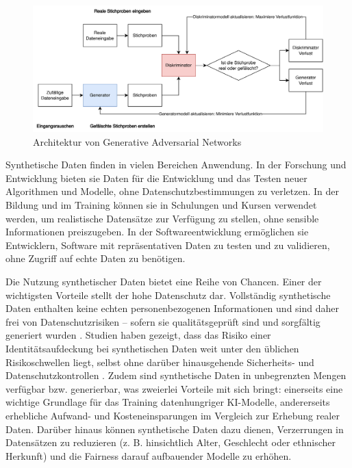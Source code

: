 \begin{spacing}{1.5}
\newpage

\begin{figure}[ht]
\begin{center}
\includegraphics[width=\textwidth]{img/gan.png}
\caption[Architektur von Generative Adversarial Networks]{Architektur von Generative Adversarial Networks\footnotemark}
\label{fig:gan-architecture}
\end{center}
\end{figure}

Synthetische Daten finden in vielen Bereichen Anwendung. In der Forschung und Entwicklung bieten sie Daten für die Entwicklung und das Testen neuer Algorithmen und Modelle, ohne Datenschutzbestimmungen zu verletzen. In der Bildung und im Training können sie in Schulungen und Kursen verwendet werden, um realistische Datensätze zur Verfügung zu stellen, ohne sensible Informationen preiszugeben. In der Softwareentwicklung ermöglichen sie Entwicklern, Software mit repräsentativen Daten zu testen und zu validieren, ohne Zugriff auf echte Daten zu benötigen.

Die Nutzung synthetischer Daten bietet eine Reihe von Chancen. Einer der wichtigsten Vorteile stellt der hohe Datenschutz dar. Vollständig synthetische Daten enthalten keine echten personenbezogenen Informationen und sind daher frei von Datenschutzrisiken -- sofern sie qualitätsgeprüft sind und sorgfältig generiert wurden \cite[58]{hradec_multipurpose_2022}. Studien haben gezeigt, dass das Risiko einer Identitätsaufdeckung bei synthetischen Daten weit unter den üblichen Risikoschwellen liegt, selbst ohne darüber hinausgehende Sicherheits- und Datenschutzkontrollen \cite[9]{el_emam_evaluating_2020}. Zudem sind synthetische Daten in unbegrenzten Mengen verfügbar bzw. generierbar, was zweierlei Vorteile mit sich bringt: einerseits eine wichtige Grundlage für das Training datenhungriger KI-Modelle, andererseits erhebliche Aufwand- und Kosteneinsparungen im Vergleich zur Erhebung realer Daten. Darüber hinaus können synthetische Daten dazu dienen, Verzerrungen in Datensätzen zu reduzieren (z. B. hinsichtlich Alter, Geschlecht oder ethnischer Herkunft) und die Fairness darauf aufbauender Modelle zu erhöhen.


\end{spacing}
